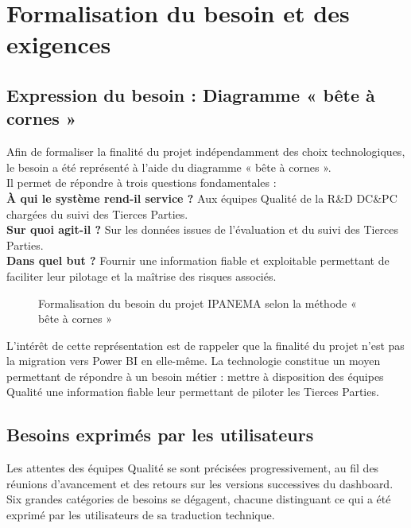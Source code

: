 \section{Formalisation du besoin et des exigences}
\subsection{Expression du besoin : Diagramme « bête à cornes »}
Afin de formaliser la finalité du projet indépendamment des choix technologiques, le 
besoin a été représenté à l’aide du diagramme « bête à cornes ». \\
Il permet de répondre à trois questions fondamentales : \\
\textbf{À qui le système rend-il service ?}
Aux équipes Qualité de la R\&D DC\&PC chargées du suivi des Tierces Parties. \\
\textbf{Sur quoi agit-il ?}
Sur les données issues de l’évaluation et du suivi des Tierces Parties. \\
\textbf{Dans quel but ? }
Fournir une information fiable et exploitable permettant de faciliter leur pilotage et la maîtrise 
des risques associés.

\begin{figure}[H]
    \centering
    \caption{Formalisation du besoin du projet IPANEMA selon la méthode « bête à cornes »}
    \label{Formalisation_du_besoin_du_projet_IPANEMA}
\end{figure}

L’intérêt de cette représentation est de rappeler que la finalité du projet n’est pas la 
migration vers Power BI en elle-même. La technologie constitue un moyen permettant de 
répondre à un besoin métier : mettre à disposition des équipes Qualité une information fiable 
leur permettant de piloter les Tierces Parties.

\subsection{Besoins exprimés par les utilisateurs} 
Les attentes des équipes Qualité se sont précisées progressivement, au fil des 
réunions d'avancement et des retours sur les versions successives du dashboard. Six 
grandes catégories de besoins se dégagent, chacune distinguant ce qui a été exprimé par 
les utilisateurs de sa traduction technique.

